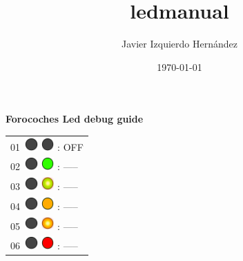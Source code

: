 \documentclass[12pt, a4paper]{report}
\title{ledmanual}
\author{Javier Izquierdo Hernández}
\date{\today}
\begin{document}
	\thispagestyle{empty}
	\centering
	{\bfseries\Huge Forocoches Led debug guide \par}
	\vspace{1cm}
	\begin{minipage}{0.45\textwidth}
	\centering
	\begin{Large}
	
	\begin{tabular}{l}
		01\  \includegraphics*[width=5mm]{off_led} \includegraphics*[width=5mm]{off_led} : OFF\\
		
		02\  \includegraphics*[width=5mm]{off_led} \includegraphics*[width=5mm]{green_led} : -----\\
		
		03\  \includegraphics*[width=5mm]{off_led} \includegraphics*[width=5mm]{green_led_flashing} : -----\\

		04\  \includegraphics*[width=5mm]{off_led} \includegraphics*[width=5mm]{orange_led} : -----\\
		
		05\  \includegraphics*[width=5mm]{off_led} \includegraphics*[width=5mm]{orange_led_flashing} : -----\\
		
		06\  \includegraphics*[width=5mm]{off_led} \includegraphics*[width=5mm]{red_led} : -----\\
		

\end{tabular}
\end{Large}
\end{minipage}
\end{document}
